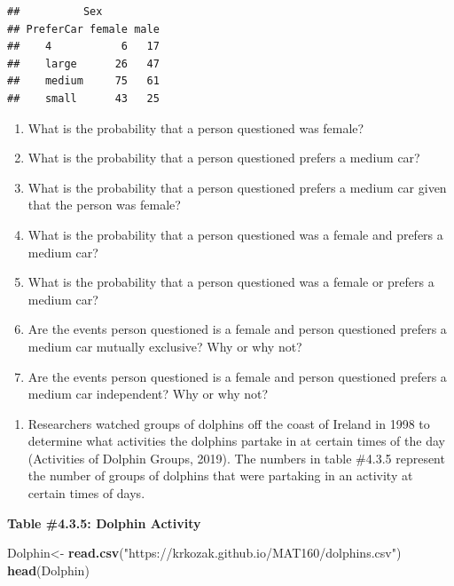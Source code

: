 \documentclass[
]{book}
\newenvironment{Shaded}{\begin{snugshade}}{\end{snugshade}}
\newcommand{\KeywordTok}[1]{\textcolor[rgb]{0.13,0.29,0.53}{\textbf{#1}}}
\newcommand{\NormalTok}[1]{#1}
\newcommand{\StringTok}[1]{\textcolor[rgb]{0.31,0.60,0.02}{#1}}
\providecommand{\tightlist}{%
  \setlength{\itemsep}{0pt}\setlength{\parskip}{0pt}}
\begin{document}
\begin{verbatim}
##          Sex
## PreferCar female male
##    4           6   17
##    large      26   47
##    medium     75   61
##    small      43   25
\end{verbatim}

\begin{enumerate}
\def\labelenumi{\alph{enumi}.}
\tightlist
\item
  What is the probability that a person questioned was female?
\item
  What is the probability that a person questioned prefers a medium car?
\item
  What is the probability that a person questioned prefers a medium car given that the person was female?
\item
  What is the probability that a person questioned was a female and prefers a medium car?
\item
  What is the probability that a person questioned was a female or prefers a medium car?
\item
  Are the events person questioned is a female and person questioned prefers a medium car mutually exclusive? Why or why not?
\item
  Are the events person questioned is a female and person questioned prefers a medium car independent? Why or why not?
\end{enumerate}

\begin{enumerate}
\def\labelenumi{\arabic{enumi}.}
\setcounter{enumi}{11}
\tightlist
\item
  Researchers watched groups of dolphins off the coast of Ireland in 1998 to determine what activities the dolphins partake in at certain times of the day (Activities of Dolphin Groups, 2019). The numbers in
  table \#4.3.5 represent the number of groups of dolphins that were partaking in an activity at certain times of days.
\end{enumerate}

\textbf{Table \#4.3.5: Dolphin Activity}

\begin{Shaded}
\begin{Highlighting}[]
\NormalTok{Dolphin<-}\StringTok{ }\KeywordTok{read.csv}\NormalTok{(}\StringTok{"https://krkozak.github.io/MAT160/dolphins.csv"}\NormalTok{) }
\KeywordTok{head}\NormalTok{(Dolphin)}
\end{Highlighting}
\end{Shaded}
\end{document}
